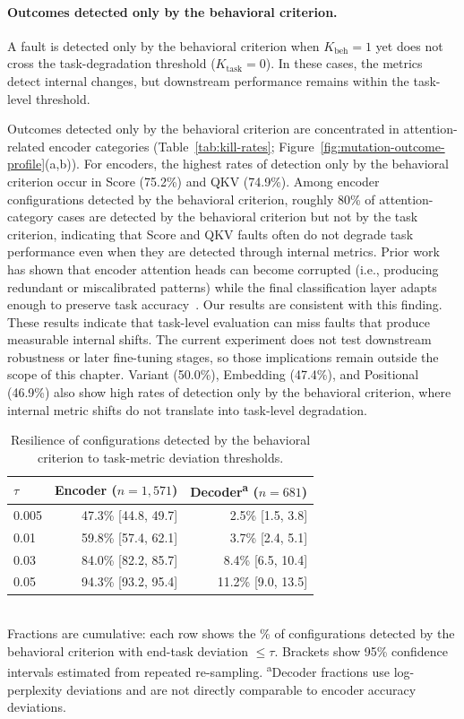 \paragraph{Outcomes detected only by the behavioral criterion.}
A fault is detected only by the behavioral criterion when $K_{\text{beh}} = 1$ yet does not cross the task-degradation threshold ($K_{\text{task}} = 0$). In these cases, the metrics detect internal changes, but downstream performance remains within the task-level threshold.

Outcomes detected only by the behavioral criterion are concentrated in attention-related encoder categories (Table~\ref{tab:kill-rates}; Figure~\ref{fig:mutation-outcome-profile}(a,b)). For encoders, the highest rates of detection only by the behavioral criterion occur in Score (75.2\%) and QKV (74.9\%). Among encoder configurations detected by the behavioral criterion, roughly 80\% of attention-category cases are detected by the behavioral criterion but not by the task criterion, indicating that Score and QKV faults often do not degrade task performance even when they are detected through internal metrics. Prior work has shown that encoder attention heads can become corrupted (i.e., producing redundant or miscalibrated patterns) while the final classification layer adapts enough to preserve task accuracy~\citep{michel2019sixteen,voita2019analyzing}. Our results are consistent with this finding. These results indicate that task-level evaluation can miss faults that produce measurable internal shifts. The current experiment does not test downstream robustness or later fine-tuning stages, so those implications remain outside the scope of this chapter. Variant (50.0\%), Embedding (47.4\%), and Positional (46.9\%) also show high rates of detection only by the behavioral criterion, where internal metric shifts do not translate into task-level degradation.

\begin{table}[!htbp]
\caption{Resilience of configurations detected by the behavioral criterion to task-metric deviation thresholds.}
\label{tab:resilience}
\centering
\footnotesize
\renewcommand{\arraystretch}{1.0}
\begin{tabular}{@{} l r r @{}}
\toprule
\textbf{$\tau$} & \textbf{Encoder ($n{=}1{,}571$)} & \textbf{Decoder\textsuperscript{a} ($n{=}681$)} \\
\midrule
0.005 & 47.3\% [44.8, 49.7] &  2.5\% [1.5, 3.8] \\
0.01  & 59.8\% [57.4, 62.1] &  3.7\% [2.4, 5.1] \\
0.03  & 84.0\% [82.2, 85.7] &  8.4\% [6.5, 10.4] \\
0.05  & 94.3\% [93.2, 95.4] & 11.2\% [9.0, 13.5] \\
\bottomrule
\end{tabular}
\smallskip\\
{\scriptsize Fractions are cumulative: each row shows the \% of configurations detected by the behavioral criterion with end-task deviation $\leq \tau$. Brackets show 95\% confidence intervals estimated from repeated re-sampling. \textsuperscript{a}Decoder fractions use log-perplexity deviations and are not directly comparable to encoder accuracy deviations.}
\end{table}

